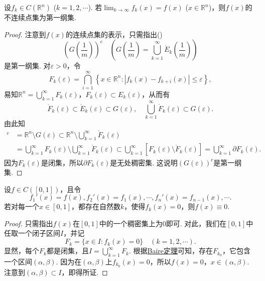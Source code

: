 \documentclass[../../main.tex]{subfiles}%
\begin{document}
\begin{example}\label{example:例15}
设$f_k\in C(\mathbb{R}^n)$ ($k = 1,2,\cdots$). 若$\lim_{k\to\infty}f_k(x)=f(x)$ ($x\in\mathbb{R}^n$)，则$f(x)$的不连续点集为第一纲集.
\end{example}
\begin{proof}

注意到$f(x)$的连续点集的表示，只需指出()
\[
\left(G\left(\frac{1}{m}\right)\right)^c \quad \left(G\left(\frac{1}{m}\right)=\bigcup_{k = 1}^{\infty}\mathring{E}_k\left(\frac{1}{m}\right)\right)
\]
是第一纲集. 对$\varepsilon>0$，令
\[
F_k(\varepsilon)=\bigcap_{i = 1}^{\infty}\left\{x\in\mathbb{R}^n: |f_k(x)-f_{k + i}(x)|\leqslant\varepsilon\right\},
\]
易知$\mathbb{R}^n=\bigcup_{k = 1}^{\infty}F_k(\varepsilon)$，$F_k(\varepsilon)\subset E_k(\varepsilon)$，从而有
\[
\mathring{F}_k(\varepsilon)\subset\mathring{E}_k(\varepsilon)\subset G(\varepsilon), \quad \bigcup_{k = 1}^{\infty}\mathring{F}_k(\varepsilon)\subset G(\varepsilon).
\]
由此知
\begin{align*}
[G(\varepsilon)]^c&=\mathbb{R}^n\setminus G(\varepsilon)\subset\mathbb{R}^n\setminus\bigcup_{k = 1}^{\infty}\mathring{F}_k(\varepsilon)\\
&=\bigcup_{k = 1}^{\infty}F_k(\varepsilon)\setminus\bigcup_{k = 1}^{\infty}\mathring{F}_k(\varepsilon)\subset\bigcup_{k = 1}^{\infty}[F_k(\varepsilon)\setminus\mathring{F}_k(\varepsilon)]=\bigcup_{k = 1}^{\infty}\partial F_k(\varepsilon).
\end{align*}
因为$F_k(\varepsilon)$是闭集，所以$\partial F_k(\varepsilon)$是无处稠密集. 这说明$(G(\varepsilon))^c$是第一纲集. 

\end{proof}

\begin{example}\label{example:例16}
设$f\in C([0,1])$，且令
\[
f_1'(x)=f(x), f_2'(x)=f_1(x), \cdots, f_n'(x)=f_{n - 1}(x), \cdots.
\]
若对每一个$x\in[0,1]$，都存在自然数$k$，使得$f_k(x)=0$，则$f(x)\equiv0$.
\end{example}
\begin{proof}

只需指出$f(x)$在$[0,1]$中的一个稠密集上为$0$即可. 对此，我们在$[0,1]$中任取一个闭子区间$I$，并记
\[
F_k=\{x\in I: f_k(x)=0\} \quad (k = 1,2,\cdots).
\]
显然，每个$F_k$都是闭集，且$I=\bigcup_{k = 1}^{\infty}F_k$. 根据\hyperref[theorem:Baire定理]{Baire定理}可知，存在$F_{k_0}$，它包含一个区间$(\alpha,\beta)$. 因为在$(\alpha,\beta)$上$f_{k_0}(x)=0$，所以$f(x)=0$，$x\in(\alpha,\beta)$. 注意到$(\alpha,\beta)\subset I$，即得所证. 

\end{proof}
\end{document}
